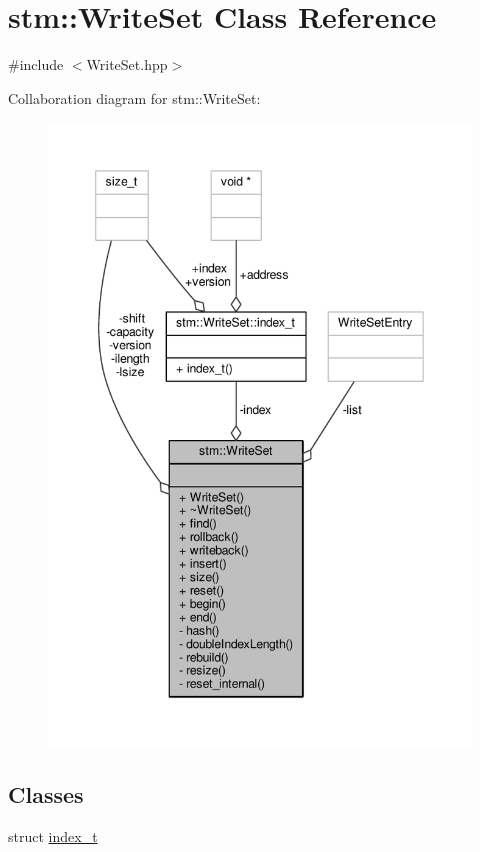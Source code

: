 \hypertarget{classstm_1_1WriteSet}{\section{stm\-:\-:Write\-Set Class Reference}
\label{classstm_1_1WriteSet}
}


{\ttfamily \#include $<$Write\-Set.\-hpp$>$}



Collaboration diagram for stm\-:\-:Write\-Set\-:
\nopagebreak
\begin{figure}[H]
\begin{center}
\leavevmode
\includegraphics[width=349pt]{classstm_1_1WriteSet__coll__graph}
\end{center}
\end{figure}
\subsection*{Classes}
\begin{DoxyCompactItemize}
\item 
struct \hyperlink{structstm_1_1WriteSet_1_1index__t}{index\-\_\-t}
\end{DoxyCompactItemize}
